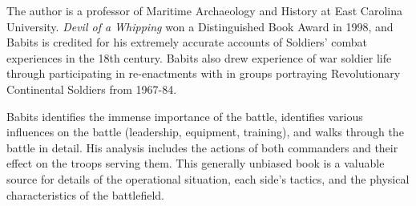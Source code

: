 The author is a professor of Maritime Archaeology and History at East Carolina
University.  \emph{Devil of a Whipping} won a Distinguished Book Award in 1998,
and Babits is credited for his extremely accurate accounts of Soldiers' combat
experiences in the 18th century.  Babits also drew experience of war soldier life
through participating in re-enactments with in groups portraying Revolutionary
Continental Soldiers from 1967-84.

Babits identifies the immense importance of the battle, identifies various
influences on the battle (leadership, equipment, training), and walks through
the battle in detail. His analysis includes the actions of both commanders and
their effect on the troops serving them.  This generally unbiased book is a
valuable source for details of the operational situation, each side's tactics,
and the physical characteristics of the battlefield.





%
%


